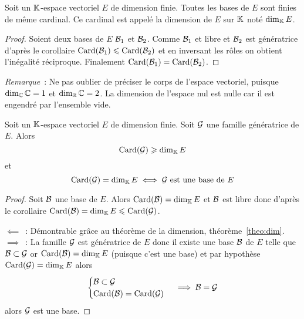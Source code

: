 \begin{theo}
  \label{theo:dim}
  Soit un \(\mathbb{K}\)-espace vectoriel \(E\) de dimension finie. Toutes les bases de 
  \(E\) sont finies de même cardinal. Ce cardinal est appelé la dimension de 
  \(E\) sur \(\mathbb{K}\) noté \(\operatorname{dim}_{\mathbb{K}} E\).
\end{theo}
\begin{proof}
  Soient deux bases de \(E\) \(\mathcal{B}_1\) et \(\mathcal{B}_2\). Comme \(\mathcal{B}_1\) et libre et 
  \(\mathcal{B}_2\) est génératrice d'après le corollaire \(\operatorname{Card}(\mathcal{B}_1) \leqslant 
  \operatorname{Card}(\mathcal{B}_2)\) et en inversant les rôles on obtient l'inégalité réciproque. 
  Finalement \(\operatorname{Card}(\mathcal{B}_1)=\operatorname{Card}(\mathcal{B}_2)\).
\end{proof}

\emph{Remarque}~: Ne pas oublier de préciser le corps de l'espace vectoriel, 
puisque \(\operatorname{dim}_{\mathbb{C}} \mathbb{C}=1\) et \(\operatorname{dim}_{\mathbb{R}} \mathbb{C}=2\). La dimension de l'espace nul est 
nulle car il est engendré par l'ensemble vide.

\begin{theo}
  Soit un \(\mathbb{K}\)-espace vectoriel \(E\) de dimension finie. Soit \(\mathcal{G}\) une 
  famille génératrice de \(E\). Alors
  \begin{equation}
    \operatorname{Card}(\mathcal{G}) \geqslant \operatorname{dim}_{\mathbb{K}} E
  \end{equation}
  et
  \begin{equation}
    \operatorname{Card}(\mathcal{G})=\operatorname{dim}_{\mathbb{K}} E \iff \mathcal{G} \text{~est une base de } E
  \end{equation}
\end{theo}
\begin{proof}
  Soit \(\mathcal{B}\) une base de \(E\). Alors \(\operatorname{Card}(\mathcal{B})=\operatorname{dim}_{\mathbb{K}} E\) et \(\mathcal{B}\) est 
  libre donc d'après le corollaire \(\operatorname{Card}(\mathcal{B}) = \operatorname{dim}_{\mathbb{K}} E \leqslant 
  \operatorname{Card}(\mathcal{G})\).

  \(\impliedby\)~: Démontrable grâce au théorème de la dimension, théorème~\ref{theo:dim}.
  \(\implies\)~: La famille \(\mathcal{G}\) est génératrice de \(E\) donc il existe une 
  base \(\mathcal{B}\) de \(E\) telle que \(\mathcal{B} \subset \mathcal{G}\) or \(\operatorname{Card}(\mathcal{B}) = \operatorname{dim}_{\mathbb{K}} E\) 
  (puisque c'est une base) et par hypothèse \(\operatorname{Card}(\mathcal{G}) = \operatorname{dim}_{\mathbb{K}} E\) alors
  \begin{equation}
    \begin{cases} \mathcal{B} \subset \mathcal{G} \\ \operatorname{Card}(\mathcal{B}) = \operatorname{Card}(\mathcal{G}) \end{cases} \implies 
      \mathcal{B}=\mathcal{G}
  \end{equation}
  alors \(\mathcal{G}\) est une base.
\end{proof}

